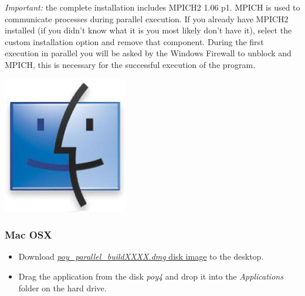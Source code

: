 \begin{flushleft}
\begin{itemize}
                \emph{Important:} the complete installation includes MPICH2 1.06 p1. MPICH is used to communicate processes during parallel execution. If you already have MPICH2 installed (if you didn't know what it is you most likely don't have it), select the custom installation option and remove that component. During the first execution in parallel you will be asked by the Windows Firewall to unblock \poy and MPICH, this is necessary for the successful execution of the program.
		\end{itemize}

	\begin{minipage}[c]{0.074\textwidth}
   		\includegraphics[width=\textwidth]{figures/figlogomac.jpg}
	\end{minipage}
	\quad
	\begin{minipage}[t]{0.88\textwidth}
	   	\subsubsection{Mac OSX}
	\end{minipage}
	            \begin{itemize}
			\item Download
            \href{http://research.amnh.org/scicomp/projects/poy.php}{\emph{poy\_parallel\_buildXXXX.dmg} disk image} to the desktop.
            		\item Drag the \poy application from the
            disk \emph{poy4} and drop it into the \emph{Applications}
            folder on the hard drive.
		\end{itemize}


\end{flushleft}
